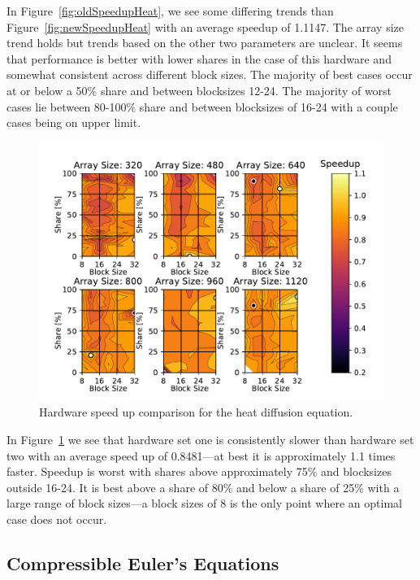\documentclass[review]{elsarticle}
\begin{document}
In Figure~\ref{fig:oldSpeedupHeat}, we see some differing trends than Figure~\ref{fig:newSpeedupHeat} with an average speedup of 1.1147. The array size trend holds but trends based on the other two parameters are unclear. It seems that performance is better with lower shares in the case of this hardware and somewhat consistent across different block sizes. The majority of best cases occur at or below a 50\% share and between blocksizes 12-24. The majority of worst cases lie between 80-100\% share and between blocksizes of 16-24 with a couple cases being on upper limit.

\begin{figure}[htb!]
    \centering
    \includegraphics[scale=0.7]{figs/hardwareSpeedupheat.pdf}
    \caption{Hardware speed up comparison for the heat diffusion equation.}
    \label{fig:heatHardwareComp}
\end{figure}

In Figure~\ref{fig:heatHardwareComp} we see that hardware set one is consistently slower than hardware set two with an average speed up of 0.8481---at best it is approximately 1.1 times faster. Speedup is worst with shares above approximately 75\% and blocksizes outside 16-24. It is best above a share of 80\% and below a share of 25\% with a large range of block sizes---a block sizes of 8 is the only point where an optimal case does not occur.

\subsection{Compressible Euler's Equations}
\label{eulerVortexResults}
\end{document}
